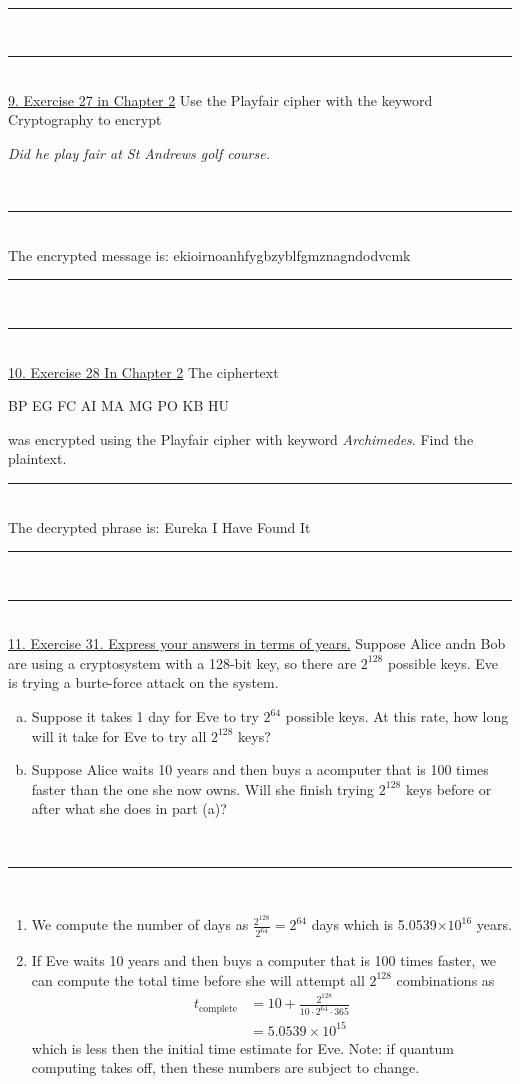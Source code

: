 \documentclass{article}
\newcommand{\problemsep}{\leavevmode\\[0.05in] \rule[\baselineskip/4]{\textwidth}{1pt} \\[0.005in] \rule[\baselineskip]{\textwidth}{1pt}\vspace{-\baselineskip}\leavevmode\\[0.05in]}
\newcommand{\statementsep}{\leavevmode\\[0.005in] \rule[\baselineskip/4]{\textwidth}{0.4pt}\leavevmode\\[0.005in]}
\begin{document}
\problemsep
\noindent\underline{9. Exercise 27 in Chapter 2}
Use the Playfair cipher with the keyword Cryptography to encrypt \\
\begin{center}{\it Did he play fair at St Andrews golf course.}\end{center}
\statementsep
The encrypted message is: ekioirnoanhfygbzyblfgmznagndodvcmk
\problemsep
\noindent\underline{10. Exercise 28 In Chapter 2}
The ciphertext \\
\begin{center}BP EG FC AI MA MG PO KB HU \end{center} 
was encrypted using the Playfair cipher with keyword {\it Archimedes}. Find the plaintext.
\statementsep
The decrypted phrase is: Eureka I Have Found It
\problemsep
\noindent\underline{11. Exercise 31. Express your answers in terms of years.}
Suppose Alice andn Bob are using a cryptosystem with a 128-bit key, so there are $2^{128}$ possible  keys. Eve is trying a burte-force attack on the system.
\begin{enumerate}[(a)]
  \item Suppose it takes 1 day for Eve to try $2^{64}$ possible keys. At this rate, how long will it take for Eve to try all $2^{128}$ keys?
	\item Suppose Alice waits 10 years and then buys a acomputer that is 100 times faster than the one she now owns. Will she finish trying $2^{128}$ keys before or after what she does in part (a)?
\end{enumerate}
\statementsep
\begin{enumerate}
	\item We compute the number of days as $\frac{2^{128}}{2^{64}} = 2^{64}$ days which is 5.0539$\times 10^{16}$ years. 
	\item If Eve waits 10 years and then buys a computer that is 100 times faster, we can compute the total time before she will attempt all $2^{128}$ combinations as
		\begin{equation*}\begin{aligned}
				t_{\text{complete}} &= 10 + \frac{2^{128}}{10\cdot 2^{64} \cdot 365} \\
                            &= 5.0539 \times 10^{15}
		\end{aligned}\end{equation*}
which is less then the initial time estimate for Eve. Note: if quantum computing takes off, then these numbers are subject to change.
\end{enumerate}
\end{document}
